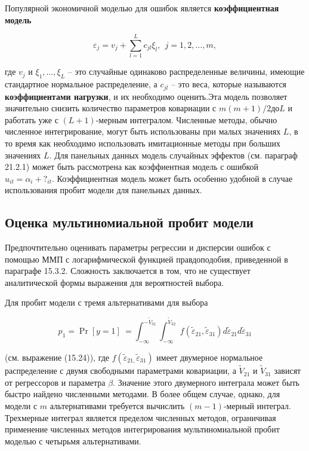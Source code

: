 Популярной экономичной моделью для ошибок является \textbf{коэффициентная модель}

\[{\varepsilon }_j=v_j+\sum^L_{l=1}{c_{jl}{\xi }_l,\ \ j=1,2,\dots ,m,}\] 

где $v_j$ и ${\xi }_1,\dots ,{\xi }_L$ -- это случайные одинаково распределенные величины, имеющие стандартное нормальное распределение, а $c_{jl}$ -- это веса, которые называются \textbf{коэффициентами нагрузки}, и их необходимо оценить.Эта модель позволяет значительно снизить количество параметров ковариации с $m(m+1)/2$до$L$ и работать уже с $(L+1)$-мерным интегралом. Численные методы, обычно численное интегрирование, могут быть использованы при малых значениях $L$, в то время как необходимо использовать имитационные методы при больших значениях $L$. Для панельных данных модель случайных эффектов (см. параграф 21.2.1) может быть рассмотрена как коэффиентная модель с ошибкой $u_{it}={\alpha }_i+?_{it}$. Коэффициентная модель может быть особенно удобной в случае использования пробит модели для панельных данных.

\subsection{Оценка мультиномиальной пробит модели}

Предпочтительно оценивать параметры регрессии и дисперсии ошибок с помощью ММП с логарифмической функцией правдоподобия, приведенной в параграфе 15.3.2. Сложность заключается в том, что не существует аналитической формы выражения для вероятностей выбора.

Для пробит модели с тремя альтернативами для выбора

\[p_1={\Pr  \left[y=1\right]\ }=\int^{-{\tilde{V}}_{31}}_{-\infty }{\int^{{\tilde{V}}_{32}}_{-\infty }{f\left({\widetilde{\varepsilon }}_{21},{\widetilde{\varepsilon }}_{31}\right)d{\widetilde{\varepsilon }}_{21}d{\widetilde{\varepsilon }}_{31}}}\] 

(см. выражение (15.24)), где $f\left({\widetilde{\varepsilon }}_{21,}{\widetilde{\varepsilon }}_{31}\right)$ имеет двумерное нормальное распределение с двумя свободными параметрами ковариации, а ${\tilde{V}}_{21}$ и ${\tilde{V}}_{31}$ зависят от регрессоров и параметра $\beta $. Значение этого двумерного интеграла может быть быстро найдено численными методами. В более общем случае, однако, для модели с $m$ альтернативами требуется вычислить $(m-1)$-мерный интеграл. Трехмерные интеграл является пределом численных методов, ограничивая применение численных методов интегрирования мультиномиальной пробит моделью с четырьмя альтернативами.

